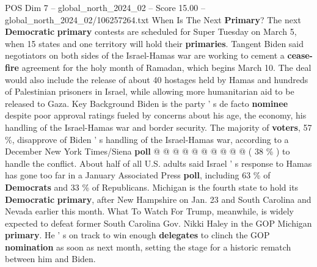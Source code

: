 \begin{textsample}{POS Dim 7 – global\_north\_2024\_02 – Score 15.00 – global\_north\_2024\_02/106257264.txt}
When Is The Next \textbf{Primary}?
The next \textbf{Democratic} \textbf{primary} contests are scheduled for Super Tuesday on March 5, when 15 states and one territory will hold their \textbf{primaries}.
Tangent Biden said negotiators on both sides of the Israel-Hamas war are working to cement a \textbf{cease-fire} agreement for the holy month of Ramadan, which begins March 10.
The deal would also include the release of about 40 hostages held by Hamas and hundreds of Palestinian prisoners in Israel, while allowing more humanitarian aid to be released to Gaza.
Key Background Biden is the party ' s de facto \textbf{nominee} despite poor approval ratings fueled by concerns about his age, the economy, his handling of the Israel-Hamas war and border security.
The majority of \textbf{voters}, 57 \%, disapprove of Biden ' s handling of the Israel-Hamas war, according to a December New York Times/Siena \textbf{poll} @ @ @ @ @ @ @ @ @ @ ( 38 \% ) to handle the conflict.
About half of all U.S. adults said Israel ' s response to Hamas has gone too far in a January Associated Press \textbf{poll}, including 63 \% of \textbf{Democrats} and 33 \% of Republicans.
Michigan is the fourth state to hold its \textbf{Democratic} \textbf{primary}, after New Hampshire on Jan. 23 and South Carolina and Nevada earlier this month.
What To Watch For Trump, meanwhile, is widely expected to defeat former South Carolina Gov.
Nikki Haley in the GOP Michigan \textbf{primary}.
He ' s on track to win enough \textbf{delegates} to clinch the GOP \textbf{nomination} as soon as next month, setting the stage for a historic rematch between him and Biden.

\end{textsample}
